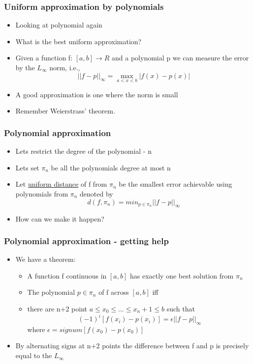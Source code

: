 \documentclass[10pt]{beamer}
\begin{document}
\begin{frame}
  \frametitle{Uniform approximation by polynomials}
  \begin{itemize}
  \item Looking at polynomial again
  \item What is the best uniform approximation?
  \item Given a function f: $[a,b] \rightarrow R$ and a polynomial p we can measure the error by the $L_{\infty}$ norm, i.e.,
    \[
      ||f-p||_{\infty} = \max_{a<x<b} | f(x) - p(x) |
    \]
  \item A good approximation is one where the norm is small
  \item Remember Weierstrass' theorem.
  \end{itemize}
\end{frame}

\begin{frame}
  \frametitle{Polynomial approximation}
  \begin{itemize}
  \item Lets restrict the degree of the polynomial - n
  \item Lets set $\pi_n$ be all the polynomials degree at most n
  \item Let {\underline{uniform distance}} of f from $\pi_n$ be the smallest
    error achievable using polynomials from $\pi_n$ denoted by
    \[
      d(f,\pi_n) = min_{p\in \pi_n} ||f - p ||_{\infty}
    \]

  \item How can we make it happen? 
  \end{itemize}
\end{frame}

\begin{frame}
  \frametitle{Polynomial approximation - getting help}
  \begin{itemize}
  \item We have a theorem:
    \begin{itemize}
    \item A function f continuous in $[a,b]$ has exactly one best
      solution from $\pi_n$
    \item The polynomial $p \in \pi_n$ of f across $[a,b]$ iff
    \item there are n+2 point $a \leq x_0 \leq \ldots \leq x_n+1 \leq b$ such that
      \[
        (-1)^i [ f(x_i) - p(x_i) ] = \epsilon ||f-p||_{\infty}
      \]
      where $\epsilon = signum[f(x_0)-p(x_0)]$
    \end{itemize}
  \item By alternating signs at n+2 points the difference between f and p is precisely equal to the $L_{\infty}$
  \end{itemize}
\end{frame}
\end{document}
